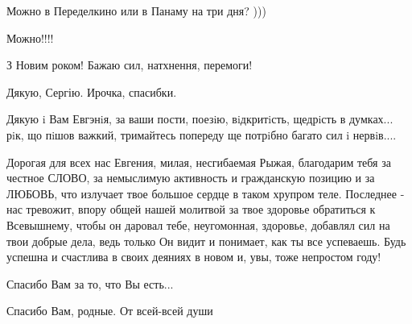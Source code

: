 \begin{itemize}
Можно в Переделкино или в Панаму на три дня? )))

Можно!!!!

З Новим роком! Бажаю сил, натхнення, перемоги!

Дякую, Сергію. Ирочка, спасибки.

Дякую i Вам Евгэнiя, за ваши пости, поезiю, вiдкритiсть, щедрiсть в думках...
рiк, що пiшов важкий, тримайтесь попереду ще потрiбно багато сил i нервiв....


Дорогая для всех нас Евгения, милая, несгибаемая Рыжая, благодарим тебя за
честное СЛОВО, за немыслимую активность и гражданскую позицию и за ЛЮБОВЬ, что
излучает твое большое сердце в таком хрупром теле. Последнее - нас тревожит,
впору общей нашей молитвой за твое здоровье обратиться к Всевышнему, чтобы он
даровал тебе, неугомонная, здоровье, добавлял сил на твои добрые дела, ведь
только Он видит и понимает, как ты все успеваешь. Будь успешна и счастлива в
своих деяниях в новом и, увы, тоже непростом году!


Спасибо Вам за то, что Вы есть...

Спасибо Вам, родные. От всей-всей души

\end{itemize}


